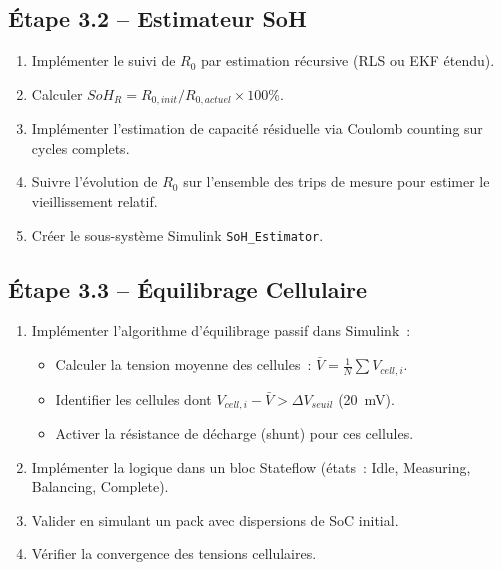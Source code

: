 \documentclass[a4paper,12pt]{article}
\begin{document}
\subsection{Étape 3.2 -- Estimateur SoH}
\begin{enumerate}[nosep]
  \item Implémenter le suivi de $R_0$ par estimation récursive (RLS ou EKF étendu).
  \item Calculer $SoH_R = R_{0,init} / R_{0,actuel} \times 100\%$.
  \item Implémenter l'estimation de capacité résiduelle via Coulomb counting sur cycles complets.
  \item Suivre l'évolution de $R_0$ sur l'ensemble des trips de mesure pour estimer le vieillissement relatif.
  \item Créer le sous-système Simulink \texttt{SoH\_Estimator}.
\end{enumerate}

\subsection{Étape 3.3 -- Équilibrage Cellulaire}
\begin{enumerate}[nosep]
  \item Implémenter l'algorithme d'équilibrage passif dans Simulink~:
    \begin{itemize}[nosep]
      \item Calculer la tension moyenne des cellules~: $\bar{V} = \frac{1}{N}\sum V_{cell,i}$.
      \item Identifier les cellules dont $V_{cell,i} - \bar{V} > \Delta V_{seuil}$ (20~mV).
      \item Activer la résistance de décharge (shunt) pour ces cellules.
    \end{itemize}
  \item Implémenter la logique dans un bloc Stateflow (états~: Idle, Measuring, Balancing, Complete).
  \item Valider en simulant un pack avec dispersions de SoC initial.
  \item Vérifier la convergence des tensions cellulaires.
\end{enumerate}
\end{document}

